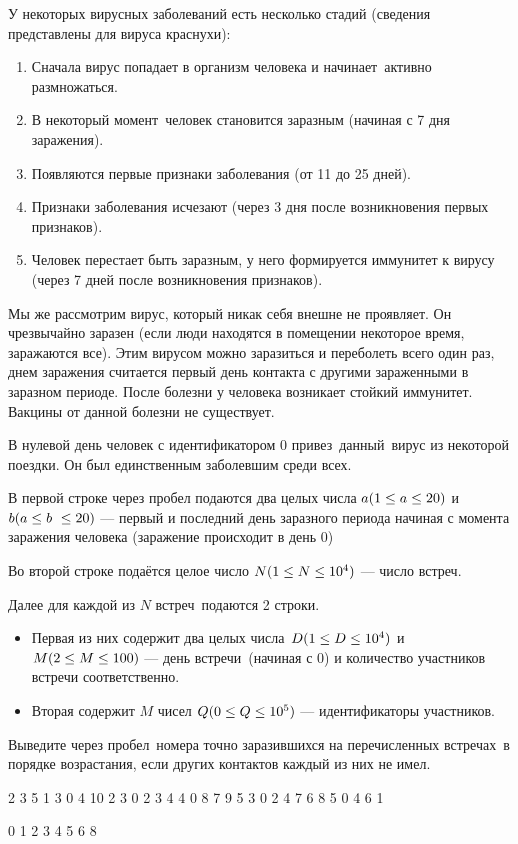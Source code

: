 
У некоторых вирусных заболеваний есть несколько стадий (сведения представлены для вируса краснухи):

\begin{enumerate}
\item Сначала вирус попадает в организм человека и начинает активно размножаться.
\item В некоторый момент человек становится заразным (начиная с 7 дня заражения).
\item Появляются первые признаки заболевания (от 11 до 25 дней).
\item Признаки заболевания исчезают (через 3 дня после возникновения первых признаков).
\item Человек перестает быть заразным, у него формируется иммунитет к вирусу (через 7 дней после возникновения признаков).
\end{enumerate}
Мы же рассмотрим вирус, который никак себя внешне не проявляет. Он чрезвычайно заразен (если люди находятся в помещении некоторое время, заражаются все). Этим вирусом можно заразиться и переболеть всего один раз, днем заражения считается первый день контакта с другими зараженными в заразном периоде. После болезни у человека возникает стойкий иммунитет. Вакцины от данной болезни не существует.

В нулевой день человек с идентификатором 0 привез данный вирус из некоторой поездки. Он был единственным заболевшим среди всех.

В первой строке через пробел подаются два целых числа $a\space (1\leq a \leq 20)$ и $b\space(a \leq b \leq 20)$ — первый и последний день заразного периода начиная с момента заражения человека (заражение происходит в день 0)

Во второй строке подаётся целое число $N\space(1\leq N\leq 10^4)$ — число встреч.

Далее для каждой из $N$ встреч подаются 2 строки.

\begin{itemize}
\item Первая из них содержит два целых числа $D\space(1\leq D\leq 10^4)$ и $M\space(2\leq M\leq 100)$ — день встречи (начиная с 0) и количество участников встречи соответственно.
\item Вторая содержит $M$ чисел $Q\space(0\leq Q\leq 10^5)$ — идентификаторы участников.
\end{itemize}

\outputfmtSection

Выведите через пробел номера точно заразившихся на перечисленных встречах в порядке возрастания, если других контактов каждый из них не имел.


\begin{myverbbox}[\small]{\vinput}
    2 3
    5
    1 3
    0 4 10
    2 3
    0 2 3
    4 4
    0 8 7 9
    5 3
    0 2 4
    7 6
    8 5 0 4 6 1
\end{myverbbox}

\begin{myverbbox}[\small]{\voutput}
    0 1 2 3 4 5 6 8
\end{myverbbox}
